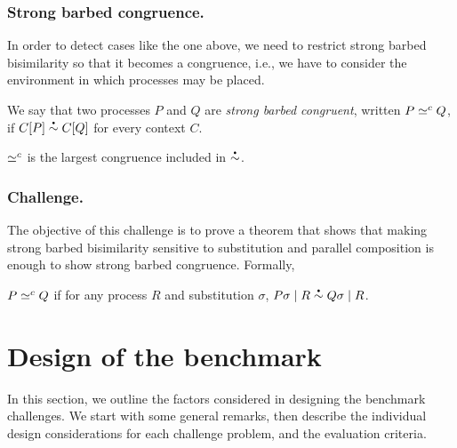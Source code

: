 \documentclass[runningheads]{llncs}
\begin{document}

\subsubsection{Strong barbed congruence.}
In order to detect cases like the one above, we need to restrict strong barbed bisimilarity so that it becomes a congruence,
i.e., %
we have to consider the environment in which processes may be placed.

We say that two processes \( P \) and \( Q \) are \emph{strong barbed congruent}, written \( P \simeq^c Q \), if \( \sbbisim{\applyctx{C}{P}}{\applyctx{C}{Q}} \) for every context \( C \).

\begin{lemma}
  \( \simeq^c \) is the largest congruence included in
  \( \sbbisim{}{} \).
\end{lemma}

\subsubsection{Challenge.}
The objective of this challenge is to prove a theorem that shows that
making strong barbed bisimilarity sensitive to substitution and
parallel composition is enough to show strong barbed
congruence. Formally,
\begin{theorem}
  \( P \simeq^c Q \) if for any process \( R \) and
  substitution \( \sigma \),
  \(
  \sbbisim{\Ppar{\applysubst{\sigma}{P}}{R}}{\Ppar{\applysubst{\sigma}{Q}}{R}}
  \).
\end{theorem}

\section{Design of the benchmark}\label{sec:design-discussion}

In this section, we outline the factors considered in designing the
benchmark challenges. We start with some general remarks, then
describe the individual design considerations for each challenge problem,
and the evaluation criteria.
\end{document}
